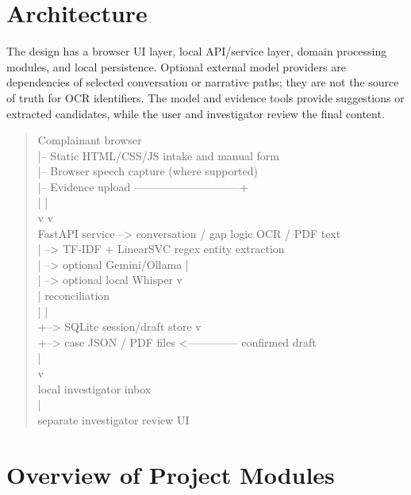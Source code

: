 \documentclass[12pt,a4paper,oneside]{report}
\begin{document}
\section{Architecture}
The design has a browser UI layer, local API/service layer, domain processing modules, and local persistence. Optional external model providers are dependencies of selected conversation or narrative paths; they are not the source of truth for OCR identifiers. The model and evidence tools provide suggestions or extracted candidates, while the user and investigator review the final content.\par\medskip
\begin{quote}\ttfamily\footnotesize Complainant browser\\  |-- Static HTML/CSS/JS intake and manual form\\  |-- Browser speech capture (where supported)\\  |-- Evidence upload -----------------------------+\\  |                                                 |\\  v                                                 v\\FastAPI service --> conversation / gap logic     OCR / PDF text\\  |               --> TF-IDF + LinearSVC         regex entity extraction\\  |               --> optional Gemini/Ollama       |\\  |               --> optional local Whisper       v\\  |                                            reconciliation\\  |                                                 |\\  +--> SQLite session/draft store                  v\\  +--> case JSON / PDF files <-------------- confirmed draft\\                        |\\                        v\\                 local investigator inbox\\                        |\\            separate investigator review UI\end{quote}
\section{Overview of Project Modules}
\end{document}
